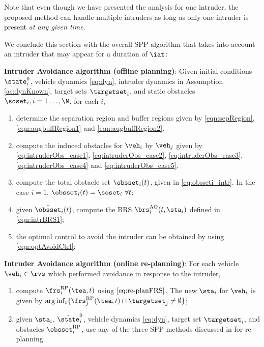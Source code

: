 \begin{remark}
Note that even though we have presented the analysis for one intruder, the proposed method can handle multiple intruders as long as only one intruder is present \textit{at any given time}. 
\end{remark}

We conclude this section with the overall SPP algorithm that takes into account an intruder that may appear for a duration of $\iat$: 
\begin{alg}
\label{alg:intruder}
\textbf{Intruder Avoidance algorithm (offline planning)}: Given initial conditions $\state_i^0$, vehicle dynamics \eqref{eq:dyn}, intruder dynamics in Assumption \ref{as:dynKnown}, target sets $\targetset_i$, and static obstacles $\soset_i, i = 1\ldots, \N$, for each $i$,
\begin{enumerate}
\item determine the separation region and buffer regions given by \eqref{eqn:sepRegion}, \eqref{eqn:augbuffRegion1} and \eqref{eqn:augbuffRegion2}.
\item compute the induced obstacles for $\veh_i$ by $\veh_j$ given by \eqref{eq:intruderObs_case1}, \eqref{eq:intruderObs_case2}, \eqref{eq:intruderObs_case3}, \eqref{eq:intruderObs_case4} and \eqref{eq:intruderObs_case5}. 
\item compute the total obstacle set $\obsset_i(t)$, given in \eqref{eq:obsseti_intr}. In the case $i=1$, $\obsset_i(t) = \soset_i ~ \forall t$;
\item given $\tilde\obsset_i(t)$, compute the BRS $\brs^{\text{AO}}_{i}(t, \sta_i)$ defined in \eqref{eqn:intrBRS1};
\item the optimal control to avoid the intruder can be obtained by using \eqref{eqn:optAvoidCtrl};
\end{enumerate}

\textbf{Intruder Avoidance algorithm (online re-planning)}: For each vehicle $\veh_i \in \rvs$ which performed avoidance in response to the intruder,
\begin{enumerate}
\item compute $\frs_i^{\text{RP}}(\tea, t)$ using $\eqref{eq:re-planFRS}$. The new $\sta_i$ for $\veh_i$ is given by $\arg \inf_t \{ \frs_j^{\text{RP}}(\tea, t) \cap \targetset_j \neq \emptyset \}$;
\item given $\sta_i$, $\tilde{\state}_i^0$, vehicle dynamics \eqref{eq:dyn}, target set $\targetset_i$, and obstacles $\obsset_i^{\text{RP}}$, use any of the three SPP methods discussed in \cite{chen2016robust} for re-planning. 
\end{enumerate}
\end{alg}